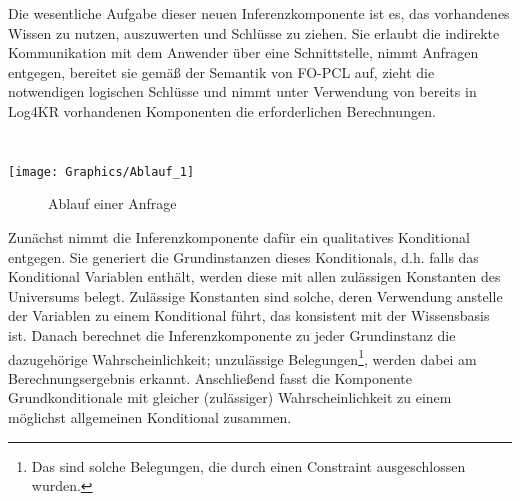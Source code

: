 \documentclass[a4paper, 11pt]{book}
\begin{document}
Die wesentliche Aufgabe dieser neuen Inferenzkomponente ist es, das vorhandenes Wissen zu nutzen, auszuwerten und Schlüsse zu ziehen. Sie erlaubt die indirekte Kommunikation mit dem Anwender über eine Schnittstelle, nimmt Anfragen entgegen, bereitet sie gemäß der Semantik von FO-PCL auf, zieht die notwendigen logischen Schlüsse und nimmt unter Verwendung von bereits in Log4KR vorhandenen Komponenten die erforderlichen Berechnungen.
\\
\\
\\ 
\texttt{[image: Graphics/Ablauf\_1]}
\begin{figure}[h]
	\caption{Ablauf einer Anfrage}
	\label{Ablauf}
\end{figure}
 
Zunächst nimmt die Inferenzkomponente dafür ein qualitatives Konditional entgegen. Sie generiert die Grundinstanzen dieses Konditionals, d.h. falls das Konditional Variablen enthält, werden diese mit allen zulässigen Konstanten des Universums belegt. Zulässige Konstanten sind solche, deren Verwendung anstelle der Variablen zu einem Konditional führt, das konsistent mit der Wissensbasis ist. Danach berechnet die Inferenzkomponente zu jeder Grundinstanz die dazugehörige Wahrscheinlichkeit; unzulässige Belegungen\footnote{Das sind solche Belegungen, die durch einen Constraint ausgeschlossen wurden.}, werden dabei am Berechnungsergebnis erkannt. Anschließend fasst die Komponente Grundkonditionale mit gleicher (zulässiger) Wahrscheinlichkeit zu einem möglichst allgemeinen Konditional zusammen.
\end{document}
